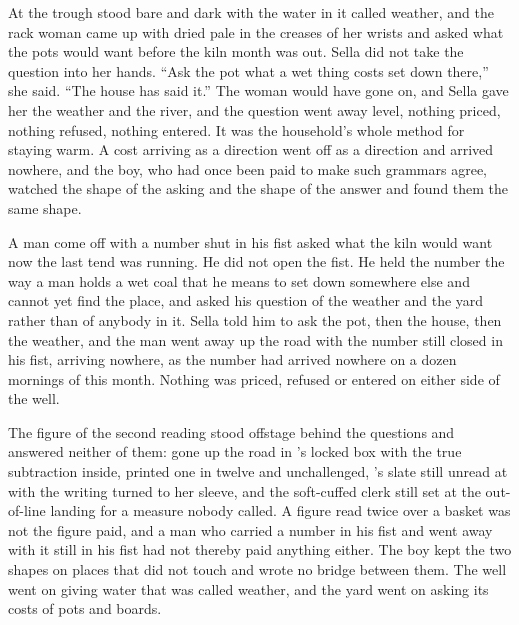 \scenebreak

At  the trough stood bare and dark with the water in it called weather, and the rack woman came up with  dried pale in the creases of her wrists and asked what the pots would want before the kiln month was out. Sella did not take the question into her hands. “Ask the pot what a wet thing costs set down there,” she said. “The house has said it.” The woman would have gone on, and Sella gave her the weather and the river, and the question went away level, nothing priced, nothing refused, nothing entered. It was the household's whole method for staying warm. A cost arriving as a direction went off as a direction and arrived nowhere, and the boy, who had once been paid to make such grammars agree, watched the shape of the asking and the shape of the answer and found them the same shape.

A man come off  with a number shut in his fist asked what the kiln would want now the last tend was running. He did not open the fist. He held the number the way a man holds a wet coal that he means to set down somewhere else and cannot yet find the place, and asked his question of the weather and the yard rather than of anybody in it. Sella told him to ask the pot, then the house, then the weather, and the man went away up the road with the number still closed in his fist, arriving nowhere, as the number had arrived nowhere on a dozen mornings of this month. Nothing was priced, refused or entered on either side of the well.

The figure of the second reading stood offstage behind the questions and answered neither of them: gone up the road in 's locked box with the true subtraction inside, printed one in twelve and unchallenged, 's slate still unread at  with the writing turned to her sleeve, and the soft-cuffed clerk still set at the out-of-line landing for a measure nobody called. A figure read twice over a basket was not the figure paid, and a man who carried a number in his fist and went away with it still in his fist had not thereby paid anything either. The boy kept the two shapes on places that did not touch and wrote no bridge between them. The well went on giving water that was called weather, and the yard went on asking its costs of pots and boards.

\scenebreak

